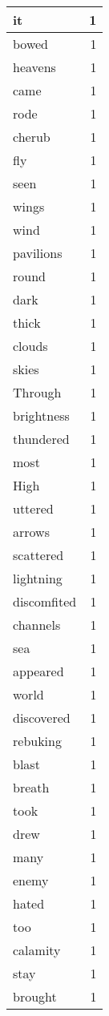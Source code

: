 \begin{center}
\begin{longtable}{l|r}
it & 1 \\ \hline
bowed & 1 \\ \hline
heavens & 1 \\ \hline
came & 1 \\ \hline
rode & 1 \\ \hline
cherub & 1 \\ \hline
fly & 1 \\ \hline
seen & 1 \\ \hline
wings & 1 \\ \hline
wind & 1 \\ \hline
pavilions & 1 \\ \hline
round & 1 \\ \hline
dark & 1 \\ \hline
thick & 1 \\ \hline
clouds & 1 \\ \hline
skies & 1 \\ \hline
Through & 1 \\ \hline
brightness & 1 \\ \hline
thundered & 1 \\ \hline
most & 1 \\ \hline
High & 1 \\ \hline
uttered & 1 \\ \hline
arrows & 1 \\ \hline
scattered & 1 \\ \hline
lightning & 1 \\ \hline
discomfited & 1 \\ \hline
channels & 1 \\ \hline
sea & 1 \\ \hline
appeared & 1 \\ \hline
world & 1 \\ \hline
discovered & 1 \\ \hline
rebuking & 1 \\ \hline
blast & 1 \\ \hline
breath & 1 \\ \hline
took & 1 \\ \hline
drew & 1 \\ \hline
many & 1 \\ \hline
enemy & 1 \\ \hline
hated & 1 \\ \hline
too & 1 \\ \hline
calamity & 1 \\ \hline
stay & 1 \\ \hline
brought & 1 \\ \hline

\end{longtable}
\end{center}
